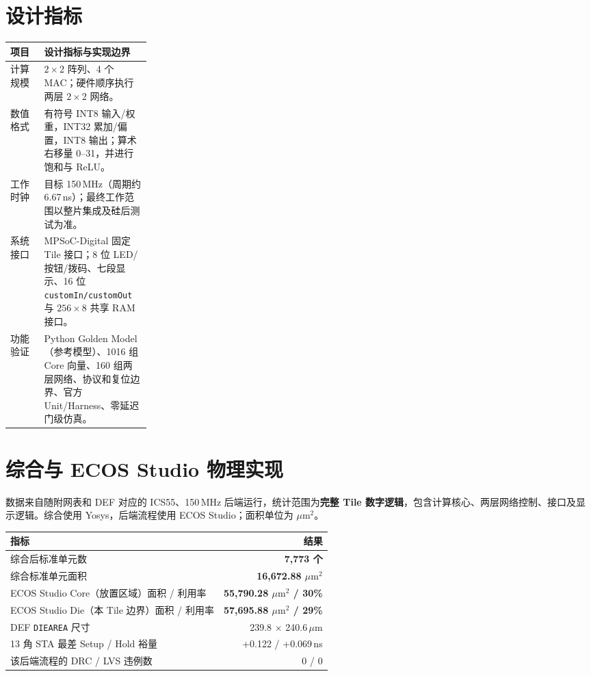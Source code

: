 \documentclass[UTF8,a4paper,11pt]{ctexart}
\newcommand{\metric}[1]{\textbf{#1}}
\begin{document}
\section{设计指标}
\begin{table}[htbp]\centering\small
\begin{tabularx}{\linewidth}{@{}p{0.24\linewidth}X@{}}\toprule
项目 & 设计指标与实现边界\\\midrule
计算规模 & $2\times2$ 阵列、4 个 MAC；硬件顺序执行两层 $2\times2$ 网络。\\
数值格式 & 有符号 INT8 输入/权重，INT32 累加/偏置，INT8 输出；算术右移量 0--31，并进行饱和与 ReLU。\\
工作时钟 & 目标 150\,MHz（周期约 6.67\,ns）；最终工作范围以整片集成及硅后测试为准。\\
系统接口 & MPSoC-Digital 固定 Tile 接口；8 位 LED/按钮/拨码、七段显示、16 位 \texttt{customIn/customOut} 与 $256\times8$ 共享 RAM 接口。\\
功能验证 & Python Golden Model（参考模型）、1016 组 Core 向量、160 组两层网络、协议和复位边界、官方 Unit/Harness、零延迟门级仿真。\\\bottomrule
\end{tabularx}
\end{table}

\clearpage
\section{综合与 ECOS Studio 物理实现}
数据来自随附网表和 DEF 对应的 ICS55、150\,MHz 后端运行，统计范围为\textbf{完整 Tile 数字逻辑}，包含计算核心、两层网络控制、接口及显示逻辑。综合使用 Yosys，后端流程使用 ECOS Studio；面积单位为 $\mu\mathrm{m}^2$。
\begin{table}[htbp]\centering\small
\begin{tabularx}{\linewidth}{@{}Xr@{}}\toprule
指标 & 结果\\\midrule
综合后标准单元数 & \metric{7,773 个}\\
综合标准单元面积 & \metric{16,672.88 $\mu\mathrm{m}^2$}\\
ECOS Studio Core（放置区域）面积 / 利用率 & \metric{55,790.28 $\mu\mathrm{m}^2$ / 30\%}\\
ECOS Studio Die（本 Tile 边界）面积 / 利用率 & \metric{57,695.88 $\mu\mathrm{m}^2$ / 29\%}\\
DEF \texttt{DIEAREA} 尺寸 & 239.8 $\times$ 240.6\,$\mu\mathrm{m}$\\
13 角 STA 最差 Setup / Hold 裕量 & +0.122 / +0.069\,ns\\
该后端流程的 DRC / LVS 违例数 & 0 / 0\\\bottomrule
\end{tabularx}
\end{table}
\end{document}
